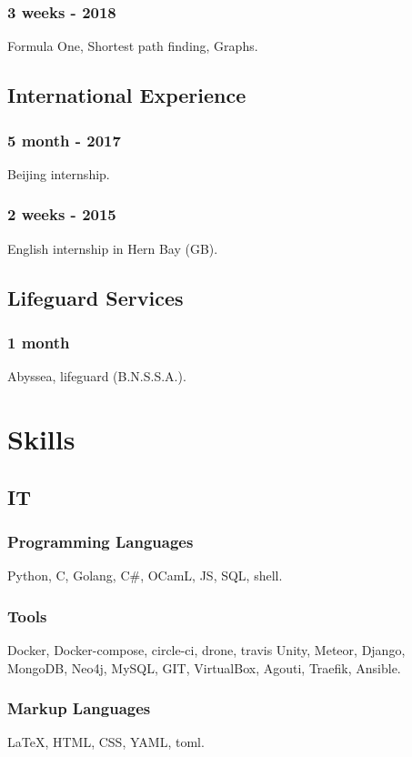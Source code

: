 \documentclass{article}
\begin{document}
\begin{multicols}{2}
                \subsubsection{3 weeks - 2018}
                    Formula One, Shortest path finding, Graphs.
            \subsection{International Experience}
                \subsubsection{5 month - 2017}
                    Beijing internship.
                \subsubsection{2 weeks - 2015}
                    English internship in Hern Bay (GB).
            \subsection{Lifeguard Services}
                \subsubsection{1 month}
                    Abyssea, lifeguard (B.N.S.S.A.).

        \columnbreak

        \section{Skills}
            \subsection{IT}
                \subsubsection{Programming Languages}
                    Python, C, Golang, C\#, OCamL, JS, SQL, shell.
                \subsubsection{Tools}
                    Docker, Docker-compose, circle-ci, drone, travis Unity, Meteor, Django,  MongoDB, Neo4j, MySQL, GIT, VirtualBox, Agouti, Traefik, Ansible.
                \subsubsection{Markup Languages}
                    {\LaTeX}, HTML, CSS, YAML, toml.

\end{multicols}
\end{document}
